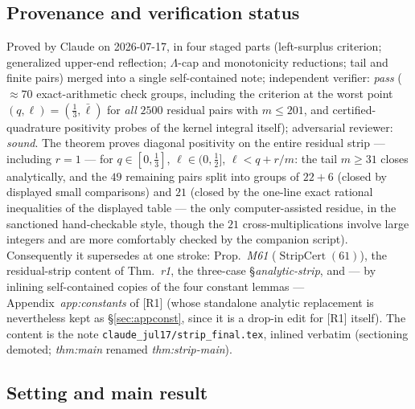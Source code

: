 \documentclass[11pt]{article}
\theoremstyle{remark}
\theoremstyle{plain}
\theoremstyle{plain}
\newcommand{\lbar}{\bar\ell}
\begin{document}
\subsection*{Provenance and verification status}
Proved by Claude on 2026-07-17, in four staged parts (left-surplus
criterion; generalized upper-end reflection; $\Lambda$-cap and
monotonicity reductions; tail and finite pairs) merged into a single
self-contained note; independent verifier: \emph{pass} ($\approx70$
exact-arithmetic check groups, including the criterion at the worst point
$(q,\ell)=(\tfrac13,\lbar)$ for \emph{all} $2500$ residual pairs with
$m\le201$, and certified-quadrature positivity probes of the kernel
integral itself); adversarial reviewer: \emph{sound}.  The theorem proves
diagonal positivity on the entire residual strip --- including $r=1$ ---
for $q\in[0,\tfrac13]$, $\ell\in(0,\tfrac12]$, $\ell<q+r/m$: the tail
$m\ge31$ closes analytically, and the $49$ remaining pairs split into
groups of $22+6$ (closed by displayed small comparisons) and $21$
(closed by the one-line exact rational inequalities of the displayed
table --- the only computer-assisted residue, in the sanctioned
hand-checkable style, though the $21$ cross-multiplications involve
large integers and are more comfortably checked by the companion
script).  Consequently it supersedes at one stroke: Prop.~\emph{M61}
($\operatorname{StripCert}(61)$), the residual-strip content of
Thm.~\emph{r1}, the three-case \S\emph{analytic-strip}, and ---
by inlining self-contained copies of the four constant lemmas ---
Appendix~\emph{app:constants} of [R1] (whose standalone analytic
replacement is nevertheless kept as \S\ref{sec:appconst}, since it is a
drop-in edit for [R1] itself).  The content is the note
\texttt{claude\_jul17/strip\_final.tex}, inlined verbatim (sectioning
demoted; \emph{thm:main} renamed \emph{thm:strip-main}).

\subsection{Setting and main result}\label{sec:setting}
\end{document}
